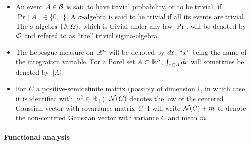 \begin{itemize}
(that is, the smallest $\sigma$-algebra w.r.t.\ which $X$ is measurable)
is denoted by~$\sigma(X)$. If $\mcal{F}$ and~$\mcal{G}$ are $\sigma$-algebras,
the $\sigma$-algebra generated by~$\mcal{F}$ and~$\mcal{G}$
(that is, the smallest $\sigma$-algebra containing both~$\mcal{F}$ and~$\mcal{G}$)
is denoted by~$\mcal{F} \vee \mcal{G}$,
and for an arbitrary number of $\sigma$-algebras this notation extends into the $\infty$-ary operator~$\bigvee$.
%
\item An event $A\in\mathcal{B}$ is said to have trivial probability, or to be trivial,
if $\Pr[A]\in\{0,1\}$. A $\sigma$-algebra is said to be trivial if all its events are trivial.
The $\sigma$-algebra $\{\emptyset,\Omega\}$, which is trivial under any law $\Pr$,
will be denoted by~$\mathcal{O}$ and refered to as ``the'' trivial sigma-algebra.
%
\item The Lebesgue measure on~$\mathbb{R}^n$ will be denoted by~$\dx{x}$,
``$x$'' being the name of the integration variable.
For a Borel set $A\subset\mathbb{R}^n$, $\int_{x\in A} \dx{x}$ will sometimes be denoted by~$|A|$.
%
\item For~$C$ a positive-semidefinite matrix (possibly of dimension $1$,
in which case it is identified with~$\sigma^2 \in \mathbb{R}_+$), $\mathcal{N}(C)$ denotes
the law of the centered Gaussian vector with covariance matrix~$C$.
I will write $\mathcal{N}(C)+m$
to denote the non-centered Gaussian vector with variance $C$ and mean $m$.
\end{itemize}


\paragraph{Functional analysis}

